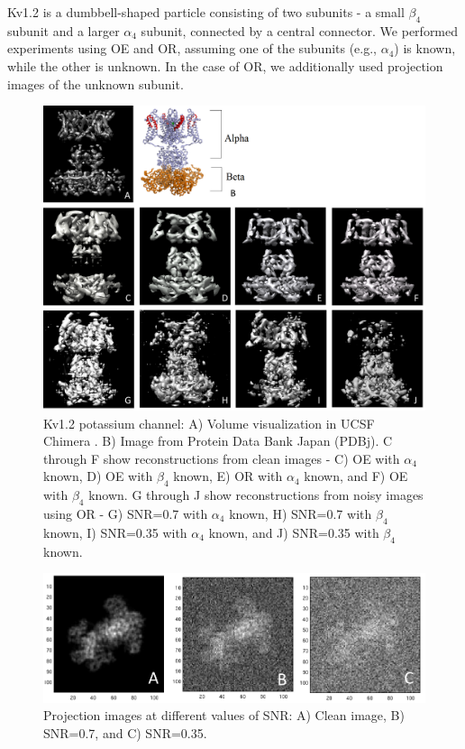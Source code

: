 Kv1.2 is a dumbbell-shaped particle consisting of two subunits - a small $\beta_4$ subunit
and a larger $\alpha_4$ subunit, connected by a central connector. We performed
experiments using OE and OR, assuming one of the subunits (e.g., $\alpha_4$) is known,
while the other is unknown. In the case of OR, we additionally used projection
images of the unknown subunit. 
\begin{figure}[t]
\begin{center}
\includegraphics[width=.99\columnwidth]{figures/reconstruction_all.png}
\end{center}
\vspace{-.1in}
\caption{Kv1.2 potassium channel: A) Volume visualization in UCSF Chimera \cite{chimera}. B) Image from Protein Data Bank Japan (PDBj). C through F show reconstructions from clean images - C) OE with $\alpha_4$ known, D) OE with $\beta_4$ known, E) OR with $\alpha_4$ known, and F) OE with $\beta_4$ known. G through J show reconstructions from noisy images using OR - G) SNR=0.7 with $\alpha_4$ known, H) SNR=0.7 with $\beta_4$ known, I) SNR=0.35 with $\alpha_4$ known, and J) SNR=0.35 with $\beta_4$ known.}
\label{fig:truth}
\end{figure}

\begin{figure}[]
\centering
  \includegraphics[width=.95\columnwidth]{figures/proj_all.png}
  \caption{Projection images at different values of SNR: A) Clean image, B) SNR=0.7, and
  C) SNR=0.35.}
\label{fig:proj}
\end{figure}

